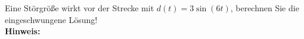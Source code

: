 \begin{question}[section=4,name={Störgröße},difficulty=,type=mdl,tags={}]
	Eine Störgröße wirkt vor der Strecke mit $d(t) = 3 \sin(6t)$, berechnen Sie die eingeschwungene Lösung!
	\\ \textbf{Hinweis:}\\
	
\end{question}
\begin{solution}
	
\end{solution}